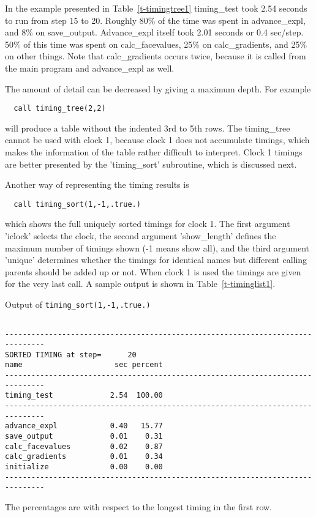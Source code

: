 In the example presented in Table~\ref{t-timingtree1} 
timing\_test took 2.54 seconds to run from step 15 to 20. 
Roughly 80\% of the time was spent in advance\_expl, and 8\% on save\_output.
Advance\_expl itself took 2.01 seconds or 0.4 sec/step. 50\% of this time
was spent on calc\_facevalues, 25\% on calc\_gradients, and 25\% on 
other things.
Note that calc\_gradients occurs twice, because it is called from
the main program and advance\_expl as well. 

The amount of detail can be decreased by giving a maximum depth. For example
\begin{verbatim}
  call timing_tree(2,2)
\end{verbatim}
will produce a table without the indented 3rd to 5th rows. 
The timing\_tree cannot be used with clock 1, because clock 1 does
not accumulate timings, which makes the information of the table
rather difficult to interpret. Clock 1 timings are better presented
by the 'timing\_sort' subroutine, which is discussed next.

Another way of representing the timing results is
\begin{verbatim}
  call timing_sort(1,-1,.true.)
\end{verbatim}
which shows the full uniquely sorted timings for clock 1. 
The first argument 'iclock' selects the clock, the second argument 
'show\_length' defines the maximum number of timings shown 
(-1 means show all), 
and the third argument 'unique' determines whether
the timings for identical names but different calling parents
should be added up or not. 
When clock 1 is used the timings are given for the very last call.
A sample output is shown in Table~\ref{t-timinglist1}.
\begin{table}
\caption{Output of {\tt timing\_sort(1,-1,.true.)}}
{\footnotesize
\begin{verbatim}

-------------------------------------------------------------------------------
SORTED TIMING at step=      20
name                     sec percent
-------------------------------------------------------------------------------
timing_test             2.54  100.00
-------------------------------------------------------------------------------
advance_expl            0.40   15.77
save_output             0.01    0.31
calc_facevalues         0.02    0.87
calc_gradients          0.01    0.34
initialize              0.00    0.00
-------------------------------------------------------------------------------

\end{verbatim}
}
\label{t-timinglist1}
\end{table}
The percentages are with respect to the longest timing in the first row.

